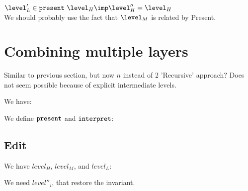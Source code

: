 
$\level'_L \in \present~\level_H \imp \level''_H = \level_H$\\
We should probably use the fact that $\level_M$ is related by {\sc Present}.

%																
%																
%																
\section{Combining multiple layers}

\bl
\* Similar to previous section, but now $n$ instead of 2
\* 'Recursive' approach? Does not seem possible because of explicit intermediate levels.
\el

We have:


We define ${\tt present}$ and ${\tt interpret}$:





\subsection{Edit}

We have $level_{H}$, $level_{M}$, and $level_{L}$:


We need $level''_i$,   that restore the invariant.



